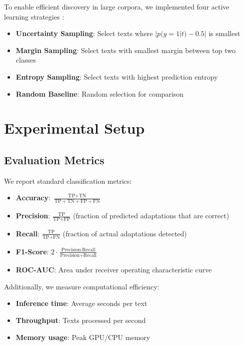 \documentclass[12pt,a4paper]{article}
\begin{document}
To enable efficient discovery in large corpora, we implemented four active learning strategies \cite{Settles2009}:

\begin{itemize}
    \item \textbf{Uncertainty Sampling}: Select texts where $|p(y=1|t) - 0.5|$ is smallest
    \item \textbf{Margin Sampling}: Select texts with smallest margin between top two classes
    \item \textbf{Entropy Sampling}: Select texts with highest prediction entropy
    \item \textbf{Random Baseline}: Random selection for comparison
\end{itemize}

\section{Experimental Setup}

\subsection{Evaluation Metrics}

We report standard classification metrics:

\begin{itemize}
    \item \textbf{Accuracy}: $\frac{\text{TP} + \text{TN}}{\text{TP} + \text{TN} + \text{FP} + \text{FN}}$
    \item \textbf{Precision}: $\frac{\text{TP}}{\text{TP} + \text{FP}}$ (fraction of predicted adaptations that are correct)
    \item \textbf{Recall}: $\frac{\text{TP}}{\text{TP} + \text{FN}}$ (fraction of actual adaptations detected)
    \item \textbf{F1-Score}: $2 \cdot \frac{\text{Precision} \cdot \text{Recall}}{\text{Precision} + \text{Recall}}$
    \item \textbf{ROC-AUC}: Area under receiver operating characteristic curve
\end{itemize}

Additionally, we measure computational efficiency:

\begin{itemize}
    \item \textbf{Inference time}: Average seconds per text
    \item \textbf{Throughput}: Texts processed per second
    \item \textbf{Memory usage}: Peak GPU/CPU memory
\end{itemize}
\end{document}
